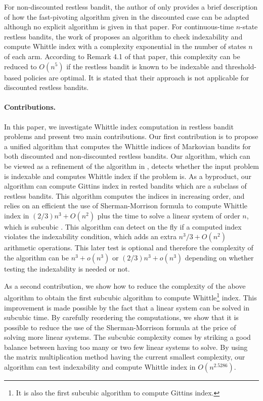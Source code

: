 \documentclass[acmsmall,screen,anonymous]{acmart}
\begin{document}
For non-discounted restless bandit,  the author of \cite{nino2020fast} only provides a brief description of how the fast-pivoting algorithm given in the discounted case can be adapted although no explicit algorithm is given in that paper. For continuous-time $n$-state restless bandits, the work of \cite{ayesta2021computation} proposes an algorithm to check indexability and compute Whittle index with a complexity exponential in the number of states $n$ of each arm. According to Remark 4.1 of that paper, this complexity can be reduced to $O(n^5)$ if the restless bandit is known to be indexable and threshold-based policies are optimal. It is stated that their approach is not applicable for discounted restless bandits.


\paragraph*{Contributions.} In this paper, we investigate Whittle index computation in restless bandit problems and present two main contributions. Our first contribution is to propose a unified algorithm that computes the Whittle indices of Markovian bandits for both discounted and non-discounted restless bandits. Our algorithm, which can be viewed as a refinement of the algorithm in \cite{akbarzadeh2020conditions}, detects whether the input problem is indexable and computes Whittle index if the problem is. As a byproduct, our algorithm can compute Gittins index in rested bandits which are a subclass of restless bandits.  This algorithm computes the indices in increasing order, and relies on an efficient the use of Sherman-Morrison formula to compute Whittle index in $(2/3)n^3 + O(n^2)$ plus the time to solve a linear system of order $n$, which is subcubic \cite{strassen1969gaussian}. This algorithm can detect on the fly if a computed index violates the indexability condition, which adds an extra $n^3/3+O(n^2)$ arithmetic operations. This later test is optional and therefore the complexity of the algorithm can be $n^3+o(n^3)$ or $(2/3)n^3 +o(n^3)$ depending on whether testing the indexability is needed or not.

As a second contribution, we show how to reduce the complexity of the above algorithm to obtain the first subcubic algorithm to compute Whittle\footnote{It is also the first subcubic algorithm to compute Gittins index.} index. This improvement is made possible by the fact that a linear system can be solved in subcubic time. By carefully reordering the computations, we show that it is possible to reduce the use of the Sherman-Morrison formula at the price of solving more linear systems. The subcubic complexity comes by striking  a good balance between having too many or two few linear systems to solve. By using the matrix multiplication method having the current smallest complexity, our algorithm can test indexability and compute Whittle index in $O(n^{2.5286})$. 
\end{document}
